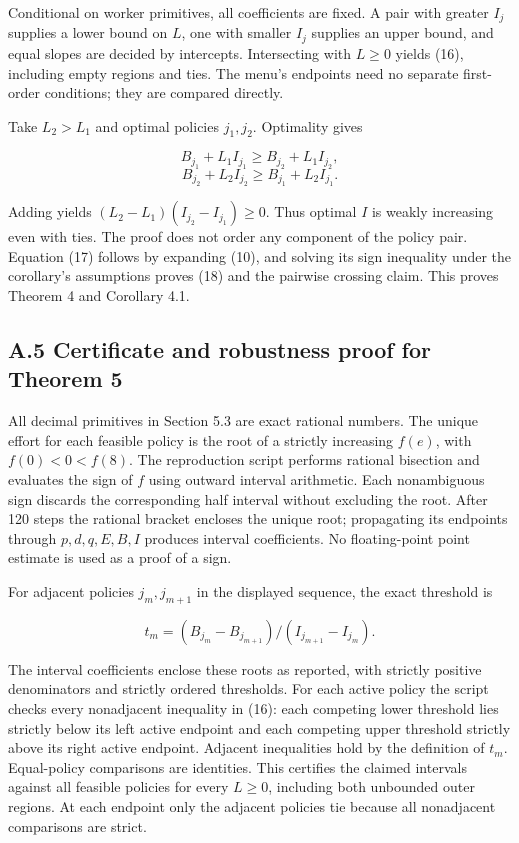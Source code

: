 \documentclass[
  11pt,
]{article}
\begin{document}
Conditional on worker primitives, all coefficients are fixed. A pair
with greater \(I_j\) supplies a lower bound on \(L\), one with smaller
\(I_j\) supplies an upper bound, and equal slopes are decided by
intercepts. Intersecting with \(L\geq0\) yields (16), including empty
regions and ties. The menu's endpoints need no separate first-order
conditions; they are compared directly.

Take \(L_2>L_1\) and optimal policies \(j_1,j_2\). Optimality gives

\[B_{j_1}+L_1I_{j_1}\geq B_{j_2}+L_1I_{j_2},\]
\[B_{j_2}+L_2I_{j_2}\geq B_{j_1}+L_2I_{j_1}.\]

Adding yields \((L_2-L_1)(I_{j_2}-I_{j_1})\geq0\). Thus optimal \(I\) is
weakly increasing even with ties. The proof does not order any component
of the policy pair. Equation (17) follows by expanding (10), and solving
its sign inequality under the corollary's assumptions proves (18) and
the pairwise crossing claim. This proves Theorem 4 and Corollary 4.1.

\subsection{A.5 Certificate and robustness proof for Theorem
5}\label{a.5-certificate-and-robustness-proof-for-theorem-5}

All decimal primitives in Section 5.3 are exact rational numbers. The
unique effort for each feasible policy is the root of a strictly
increasing \(f(e)\), with \(f(0)<0<f(8)\). The reproduction script
performs rational bisection and evaluates the sign of \(f\) using
outward interval arithmetic. Each nonambiguous sign discards the
corresponding half interval without excluding the root. After 120 steps
the rational bracket encloses the unique root; propagating its endpoints
through \(p,d,q,E,B,I\) produces interval coefficients. No
floating-point point estimate is used as a proof of a sign.

For adjacent policies \(j_m,j_{m+1}\) in the displayed sequence, the
exact threshold is

\[t_m=(B_{j_m}-B_{j_{m+1}})/(I_{j_{m+1}}-I_{j_m}).\]

The interval coefficients enclose these roots as reported, with strictly
positive denominators and strictly ordered thresholds. For each active
policy the script checks every nonadjacent inequality in (16): each
competing lower threshold lies strictly below its left active endpoint
and each competing upper threshold strictly above its right active
endpoint. Adjacent inequalities hold by the definition of \(t_m\).
Equal-policy comparisons are identities. This certifies the claimed
intervals against all feasible policies for every \(L\geq0\), including
both unbounded outer regions. At each endpoint only the adjacent
policies tie because all nonadjacent comparisons are strict.
\end{document}
